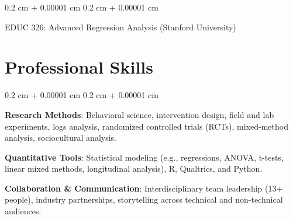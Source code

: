 \documentclass[10pt, letterpaper]{article}
\newenvironment{onecolentry}{
    \begin{adjustwidth}{
        0.2 cm + 0.00001 cm
    }{
        0.2 cm + 0.00001 cm
    }
}{
    \end{adjustwidth}
} %
\begin{document}
\begin{onecolentry}
EDUC 326: Advanced Regression Analysis (Stanford University)

\end{onecolentry}
\vspace{0.2 cm}

\section{Professional Skills}

    \begin{onecolentry}
\textbf{Research Methods}: Behavioral science, intervention design, field and lab experiments, logs analysis, randomized controlled trials (RCTs), mixed-method analysis, sociocultural analysis.

\textbf{Quantitative Tools}: Statistical modeling (e.g., regressions, ANOVA, t-tests, linear mixed methods, longitudinal analysis), R, Qualtrics, and Python.

\textbf{Collaboration \& Communication}: Interdisciplinary team leadership (13+ people), industry partnerships, storytelling across technical and non-technical audiences.

      \end{onecolentry}
    \vspace{0.2 cm}

    



\end{document}
